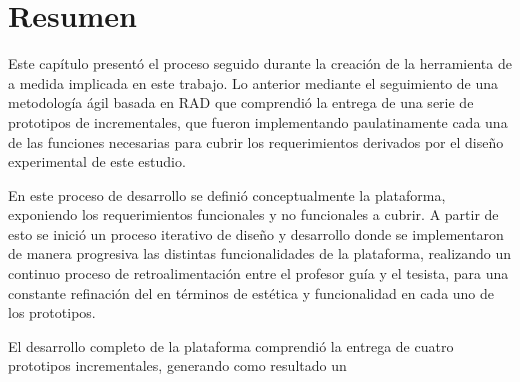 \section{Resumen}
\label{sec:desarrollo_resumen}
Este capítulo presentó el proceso seguido durante la creación de la herramienta de  a medida implicada en este trabajo. Lo anterior mediante el seguimiento de una metodología ágil basada en RAD que comprendió la entrega de una serie de prototipos de  incrementales, que fueron implementando paulatinamente cada una de las funciones necesarias para cubrir los requerimientos derivados por el diseño experimental de este estudio. 

En este proceso de desarrollo se definió conceptualmente la plataforma, exponiendo los requerimientos funcionales y no funcionales a cubrir. A partir de esto se inició un proceso iterativo de diseño y desarrollo donde se implementaron de manera progresiva las distintas funcionalidades de la plataforma, realizando un continuo proceso de retroalimentación entre el profesor guía y el tesista, para una constante refinación del  en términos de estética y funcionalidad en cada uno de los prototipos. 

El desarrollo completo de la plataforma comprendió la entrega de cuatro prototipos incrementales, generando como resultado un  

